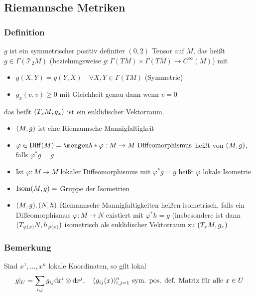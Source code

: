 \subsection{Riemannsche Metriken}
\label{sub:21}

\subsubsection[Definition: Riemannsche Metrik]{Definition}
\label{ssub:21}
 $g$ ist ein symmetrischer positiv definiter $(0,2)$ Tensor auf $M$, das heißt $g\in \Gamma(\mathcal{T}_2 M)$ (beziehungsweise $g: \Gamma(TM)\times \Gamma(TM) \to C^\infty (M)$) mit
\begin{itemize}
\item $g(X,Y) = g(Y,X)\quad \forall X,Y\in \Gamma(TM)$ (Symmetrie)
\item $g_x(v,v) \geq 0$ mit Gleichheit genau dann wenn $v = 0$
\end{itemize}
das heißt $(T_x M,g_x)$ ist ein euklidischer Vektorraum.
\begin{itemize}
\item $(M,g)$ ist eine Riemannsche Mannigfaltigkeit
\item $\varphi \in \Diff (M) = \set{\varphi: M\to M\ \text{Diffeomorphismus}}$ heißt  von $(M,g)$, falls $\varphi^* g = g$
\item Ist $\varphi: M\to M$ lokaler Diffeomorphismus mit $\varphi^* g = g$ heißt $\varphi$ lokale Isometrie
\item $\operatorname{Isom}(M,g) =$ Gruppe der Isometrien
\item $(M,g),(N,h)$ Riemannsche Mannigfaltigkeiten heißen isometrisch, falls ein Diffeomorphismus $\varphi: M\to N$ existiert mit $\varphi^* h = g$
(insbesondere ist dann $(T_{\varphi(x)} N,h_{\varphi(x)})$ isometrisch als euklidischer Vektorraum zu $(T_x M,g_x)$
\end{itemize}


\subsubsection{Bemerkung}
\label{ssub:22}
Sind $x^1,\ldots,x^n$ lokale Koordinaten, so gilt lokal
\[
g\vert_U = \sum_{i,j} g_{ij} \mathd x^i \otimes \mathd x^j,\quad \enbrace{g_{ij}(x)}_{i,j = 1}^n\ \text{sym. pos. def. Matrix für alle}\ x\in U
\]

